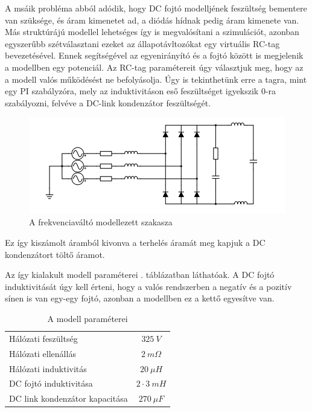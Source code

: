 A msáik probléma abból adódik, hogy DC fojtó modelljének feszültség bementere van szüksége, és áram kimenetet ad, a diódás hídnak pedig áram kimenete van. Más struktúrájú modellel lehetséges így is megvalósítani a szimulációt, azonban egyszerűbb szétválasztani ezeket az állapotávltozókat egy virtuális RC-tag bevezetésével. Ennek segítségével az egyenirányító és a fojtó között is megjelenik a modellben egy potenciál. Az RC-tag paramétereit úgy választjuk meg, hogy az a modell valós működésést ne befolyásolja. Úgy is tekinthetünk erre a tagra, mint egy PI szabályzóra, mely az induktivitáson eső feszültséget igyekszik $0$-ra szabályozni, felvéve a DC-link kondenzátor feszültségét.

\begin{figure}[H!]
	\centering
	\includegraphics[width = \textwidth]{figures/VFD_virtual_RC.png}
	\caption{A frekvenciaváltó modellezett szakasza} 
	\label{fig:virtualRC}
\end{figure}

Ez így kiszámolt áramból kivonva a terhelés áramát meg kapjuk a DC kondenzátort töltő áramot.

Az így kialakult modell paraméterei . táblázatban láthatóak. A DC fojtó induktivitását úgy kell érteni, hogy a valós rendszerben a negatív és a pozitív sínen is van egy-egy fojtó, azonban a modellben ez a kettő egyesítve van.

\begin{table}[H]
\centering
\begin{tabular}{lS}
Hálózati feszültség            & $325\ V$ 		\\
Hálózati ellenállás            & $2\ m\Omega$   \\
Hálózati induktivitás          & $20\ \mu{}H$    			\\
DC fojtó induktivitása         & $2 \cdot{} 3\ mH$    			\\
DC link kondenzátor kapacitása & $270\ \mu{}F $   
\end{tabular}
\caption{A modell paraméterei}
\label{parameters}
\end{table}

